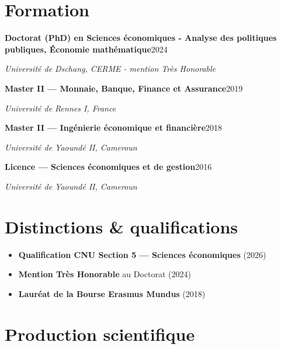 \documentclass[
  french,
  10pt,
  letterpaper,
  DIV=11,
  numbers=noendperiod]{scrartcl}
\providecommand{\tightlist}{%
  \setlength{\itemsep}{0pt}\setlength{\parskip}{0pt}}
\newcommand{\posteitem}[2]{\noindent\textbf{#1}\hfill{\color{softgray}\small #2}\par}
\begin{document}
\section{Formation}\label{formation}

\hspace{1em}\posteitem{Doctorat (PhD) en Sciences économiques - Analyse des politiques publiques, Économie mathématique}{2024}

\textit{Université de Dschang, CERME - mention Très Honorable}

\hspace{1em}\posteitem{Master II — Monnaie, Banque, Finance et Assurance}{2019}

\textit{Université de Rennes I, France}

\hspace{1em}\posteitem{Master II — Ingénierie économique et financière}{2018}

\textit{Université de Yaoundé II, Cameroun}

\hspace{1em}\posteitem{Licence — Sciences économiques et de gestion}{2016}

\textit{Université de Yaoundé II, Cameroun}

\section{Distinctions \&
qualifications}\label{distinctions-qualifications}

\begin{itemize}
\tightlist
\item
  \textbf{Qualification CNU Section 5 --- Sciences économiques} (2026)
\item
  \textbf{Mention Très Honorable} au Doctorat (2024)
\item
  \textbf{Lauréat de la Bourse Erasmus Mundus} (2018)
\end{itemize}

\newpage

\section{Production scientifique}\label{production-scientifique}

\vspace{-2pt}
\end{document}
